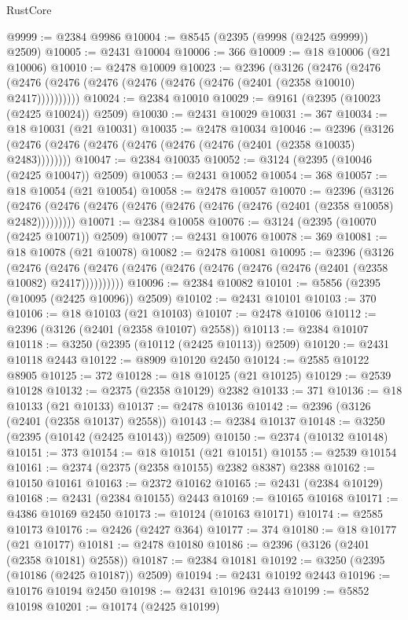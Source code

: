 \begin{lexlean}{RustCore}
\begin{coremodule}
@9999 := @2384 @9986
@10004 := @8545 (@2395 (@9998 (@2425 @9999)) @2509)
@10005 := @2431 @10004
@10006 := 366
@10009 := @18 @10006 (@21 @10006)
@10010 := @2478 @10009
@10023 := @2396
    (@3126
      (@2476 (@2476 (@2476 (@2476 (@2476 (@2476 (@2476 (@2476 (@2401 (@2358 @10010) @2417))))))))))
@10024 := @2384 @10010
@10029 := @9161 (@2395 (@10023 (@2425 @10024)) @2509)
@10030 := @2431 @10029
@10031 := 367
@10034 := @18 @10031 (@21 @10031)
@10035 := @2478 @10034
@10046 := @2396 (@3126 (@2476 (@2476 (@2476 (@2476 (@2476 (@2476 (@2401 (@2358 @10035) @2483))))))))
@10047 := @2384 @10035
@10052 := @3124 (@2395 (@10046 (@2425 @10047)) @2509)
@10053 := @2431 @10052
@10054 := 368
@10057 := @18 @10054 (@21 @10054)
@10058 := @2478 @10057
@10070 := @2396
    (@3126 (@2476 (@2476 (@2476 (@2476 (@2476 (@2476 (@2476 (@2401 (@2358 @10058) @2482)))))))))
@10071 := @2384 @10058
@10076 := @3124 (@2395 (@10070 (@2425 @10071)) @2509)
@10077 := @2431 @10076
@10078 := 369
@10081 := @18 @10078 (@21 @10078)
@10082 := @2478 @10081
@10095 := @2396
    (@3126
      (@2476 (@2476 (@2476 (@2476 (@2476 (@2476 (@2476 (@2476 (@2401 (@2358 @10082) @2417))))))))))
@10096 := @2384 @10082
@10101 := @5856 (@2395 (@10095 (@2425 @10096)) @2509)
@10102 := @2431 @10101
@10103 := 370
@10106 := @18 @10103 (@21 @10103)
@10107 := @2478 @10106
@10112 := @2396 (@3126 (@2401 (@2358 @10107) @2558))
@10113 := @2384 @10107
@10118 := @3250 (@2395 (@10112 (@2425 @10113)) @2509)
@10120 := @2431 @10118 @2443
@10122 := @8909 @10120 @2450
@10124 := @2585 @10122 @8905
@10125 := 372
@10128 := @18 @10125 (@21 @10125)
@10129 := @2539 @10128
@10132 := @2375 (@2358 @10129) @2382
@10133 := 371
@10136 := @18 @10133 (@21 @10133)
@10137 := @2478 @10136
@10142 := @2396 (@3126 (@2401 (@2358 @10137) @2558))
@10143 := @2384 @10137
@10148 := @3250 (@2395 (@10142 (@2425 @10143)) @2509)
@10150 := @2374 (@10132 @10148)
@10151 := 373
@10154 := @18 @10151 (@21 @10151)
@10155 := @2539 @10154
@10161 := @2374 (@2375 (@2358 @10155) @2382 @8387) @2388
@10162 := @10150 @10161
@10163 := @2372 @10162
@10165 := @2431 (@2384 @10129)
@10168 := @2431 (@2384 @10155) @2443
@10169 := @10165 @10168
@10171 := @4386 @10169 @2450
@10173 := @10124 (@10163 @10171)
@10174 := @2585 @10173
@10176 := @2426 (@2427 @364)
@10177 := 374
@10180 := @18 @10177 (@21 @10177)
@10181 := @2478 @10180
@10186 := @2396 (@3126 (@2401 (@2358 @10181) @2558))
@10187 := @2384 @10181
@10192 := @3250 (@2395 (@10186 (@2425 @10187)) @2509)
@10194 := @2431 @10192 @2443
@10196 := @10176 @10194 @2450
@10198 := @2431 @10196 @2443
@10199 := @5852 @10198
@10201 := @10174 (@2425 @10199)

\end{coremodule}
\end{lexlean}
